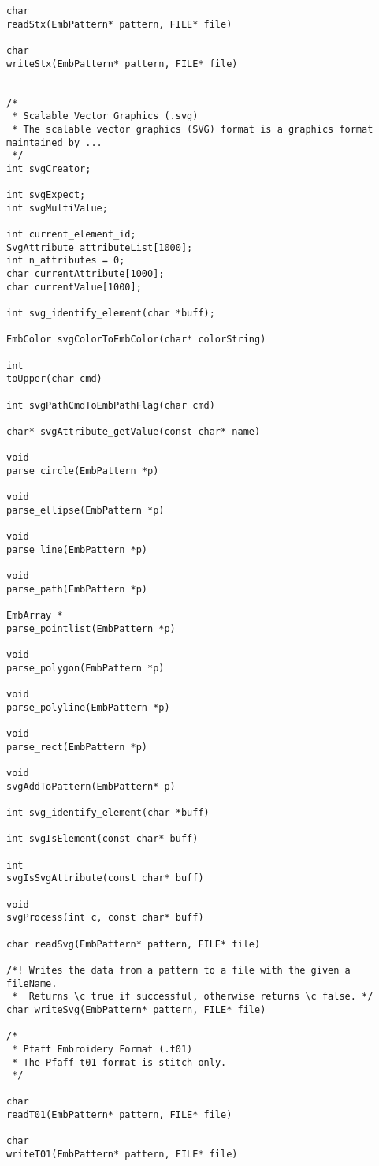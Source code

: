 \begin{lstlisting}
char
readStx(EmbPattern* pattern, FILE* file)

char
writeStx(EmbPattern* pattern, FILE* file)


/*
 * Scalable Vector Graphics (.svg)
 * The scalable vector graphics (SVG) format is a graphics format maintained by ...
 */
int svgCreator;

int svgExpect;
int svgMultiValue;

int current_element_id;
SvgAttribute attributeList[1000];
int n_attributes = 0;
char currentAttribute[1000];
char currentValue[1000];

int svg_identify_element(char *buff);

EmbColor svgColorToEmbColor(char* colorString)

int
toUpper(char cmd)

int svgPathCmdToEmbPathFlag(char cmd)

char* svgAttribute_getValue(const char* name)

void
parse_circle(EmbPattern *p)

void
parse_ellipse(EmbPattern *p)

void
parse_line(EmbPattern *p)

void
parse_path(EmbPattern *p)

EmbArray *
parse_pointlist(EmbPattern *p)

void
parse_polygon(EmbPattern *p)

void
parse_polyline(EmbPattern *p)

void
parse_rect(EmbPattern *p)

void
svgAddToPattern(EmbPattern* p)

int svg_identify_element(char *buff)

int svgIsElement(const char* buff)

int
svgIsSvgAttribute(const char* buff)

void
svgProcess(int c, const char* buff)

char readSvg(EmbPattern* pattern, FILE* file)

/*! Writes the data from a pattern to a file with the given a fileName.
 *  Returns \c true if successful, otherwise returns \c false. */
char writeSvg(EmbPattern* pattern, FILE* file)

/*
 * Pfaff Embroidery Format (.t01)
 * The Pfaff t01 format is stitch-only.
 */

char
readT01(EmbPattern* pattern, FILE* file)

char
writeT01(EmbPattern* pattern, FILE* file)


\end{lstlisting}
